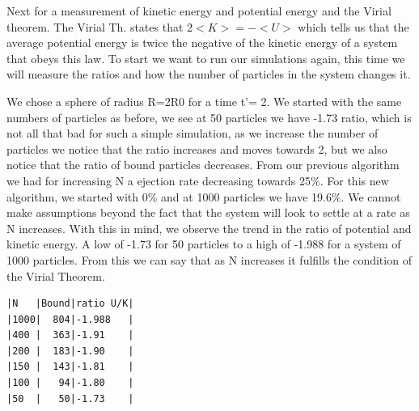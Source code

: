 \documentclass{article}
\begin{document}

Next for a measurement of kinetic energy and potential energy and
the Virial theorem. The Virial Th. states that $2<K>=-<U>$ which
tells us that the average potential energy is twice the negative of
the kinetic energy of a system that obeys this law.
To start we want to run our simulations again, this time we will
measure the ratios and how the number of particles in the system
changes it.

We chose a sphere of radius R=2R0 for a time t'= 2.
We started with the same numbers of particles as before, we see at
50 particles we have -1.73 ratio, which is not all that bad for such
a simple simulation, as we increase the number of particles we notice
that the ratio increases and moves towards 2, but we also notice that
the ratio of bound particles decreases. From our previous algorithm
we had for increasing N a ejection rate decreasing towards 25\%. For
this new algorithm, we started with 0\% and at 1000 particles we have 19.6\%.
We cannot make assumptions beyond the fact that the system will look to settle
at a rate as N increases. With this in mind, we observe the trend in the ratio
of potential and kinetic energy. A low of -1.73 for 50 particles to a high of
-1.988 for a system of 1000 particles. From this we can say that as N increases
it fulfills the condition of the Virial Theorem.
\begin{verbatim}
|N   |Bound|ratio U/K|
|1000|  804|-1.988   |
|400 |  363|-1.91    |
|200 |  183|-1.90    |
|150 |  143|-1.81    |
|100 |   94|-1.80    |
|50  |   50|-1.73    |
\end{verbatim}
\end{document}
